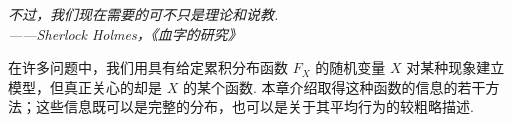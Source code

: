 \begin{flushright}\itshape
不过，我们现在需要的可不只是理论和说教.\\
——Sherlock Holmes，《血字的研究》
\end{flushright}
在许多问题中，我们用具有给定累积分布函数 $F_X$ 的随机变量 $X$ 对某种现象建立模型，但真正关心的却是 $X$ 的某个函数. 本章介绍取得这种函数的信息的若干方法；这些信息既可以是完整的分布，也可以是关于其平均行为的较粗略描述.
